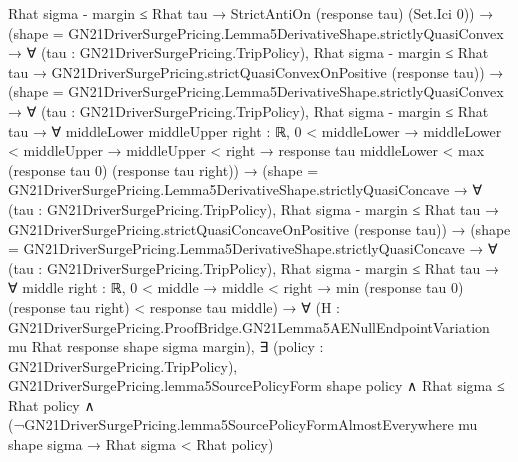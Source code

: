 \documentclass[10pt]{article}
\begin{document}
\begin{ReviewVerbatim}
                          Rhat sigma - margin ≤ Rhat tau → StrictAntiOn (response tau) (Set.Ici 0)) →
                      (shape = GN21DriverSurgePricing.Lemma5DerivativeShape.strictlyQuasiConvex →
                          ∀ (tau : GN21DriverSurgePricing.TripPolicy),
                            Rhat sigma - margin ≤ Rhat tau →
                              GN21DriverSurgePricing.strictQuasiConvexOnPositive (response tau)) →
                        (shape = GN21DriverSurgePricing.Lemma5DerivativeShape.strictlyQuasiConvex →
                            ∀ (tau : GN21DriverSurgePricing.TripPolicy),
                              Rhat sigma - margin ≤ Rhat tau →
                                ∀ {middleLower middleUpper right : ℝ},
                                  0 < middleLower →
                                    middleLower < middleUpper →
                                      middleUpper < right →
                                        response tau middleLower < max (response tau 0) (response tau right)) →
                          (shape = GN21DriverSurgePricing.Lemma5DerivativeShape.strictlyQuasiConcave →
                              ∀ (tau : GN21DriverSurgePricing.TripPolicy),
                                Rhat sigma - margin ≤ Rhat tau →
                                  GN21DriverSurgePricing.strictQuasiConcaveOnPositive (response tau)) →
                            (shape = GN21DriverSurgePricing.Lemma5DerivativeShape.strictlyQuasiConcave →
                                ∀ (tau : GN21DriverSurgePricing.TripPolicy),
                                  Rhat sigma - margin ≤ Rhat tau →
                                    ∀ {middle right : ℝ},
                                      0 < middle →
                                        middle < right →
                                          min (response tau 0) (response tau right) < response tau middle) →
                              ∀
                                (H :
                                  GN21DriverSurgePricing.ProofBridge.GN21Lemma5AENullEndpointVariation mu Rhat response
                                    shape sigma margin),
                                ∃ (policy : GN21DriverSurgePricing.TripPolicy),
                                  GN21DriverSurgePricing.lemma5SourcePolicyForm shape policy ∧
                                    Rhat sigma ≤ Rhat policy ∧
                                      (¬GN21DriverSurgePricing.lemma5SourcePolicyFormAlmostEverywhere mu shape sigma →
                                        Rhat sigma < Rhat policy)
\end{ReviewVerbatim}
\end{document}
